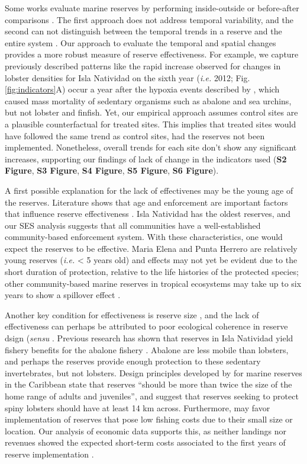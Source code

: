 \documentclass{frontiersSCNS}
\theoremstyle{definition}
\theoremstyle{definition}
\theoremstyle{definition}
\theoremstyle{remark}
\begin{document}
Some works evaluate marine reserves by performing inside-outside
\citep{guidetti_2014-8Z,friedlander_2017-oI,rodriguez_2017-PD} or
before-after comparisons \citep{betti_2017-lq}. The first approach does
not address temporal variability, and the second can not distinguish
between the temporal trends in a reserve and the entire system
\citep{depalma_2018}. Our approach to evaluate the temporal and spatial
changes provides a more robust measure of reserve effectiveness. For
example, we capture previously described patterns like the rapid
increase observed for changes in lobster densities for Isla Natividad on
the sixth year (\emph{i.e.} 2012; Fig. \ref{fig:indicators}A) occur a
year after the hypoxia events described by \citet{micheli_2012-EU},
which caused mass mortality of sedentary organisms such as abalone and
sea urchins, but not lobster and finfish. Yet, our empirical approach
assumes control sites are a plausible counterfactual for treated sites.
This implies that treated sites would have followed the same trend as
control sites, had the reserves not been implemented. Nonetheless,
overall trends for each site don't show any significant increases,
supporting our findings of lack of change in the indicators used
(\textbf{S2 Figure}, \textbf{S3 Figure}, \textbf{S4 Figure}, \textbf{S5
Figure}, \textbf{S6 Figure}).

A first possible explanation for the lack of effectivenes may be the
young age of the reserves. Literature shows that age and enforcement are
important factors that influence reserve effectiveness
\citep{edgar_2014-UO,babcock_2010}. Isla Natividad has the oldest
reserves, and our SES analysis suggests that all communities have a
well-established community-based enforcement system. With these
characteristics, one would expect the reserves to be effective. Maria
Elena and Punta Herrero are relatively young reserves (\emph{i.e.}
\textless{} 5 years old) and effects may not yet be evident due to the
short duration of protection, relative to the life histories of the
protected species; other community-based marine reserves in tropical
ecosystems may take up to six years to show a spillover effect
\citep{dasilva_2015-zX}.

Another key condition for effectiveness is reserve size
\citep{edgar_2014-UO}, and the lack of effectiveness can perhaps be
attributed to poor ecological coherence in reserve dsign (\emph{sensu}
\citet{rees_2018}. Previous research has shown that reserves in Isla
Natividad yield fishery benefits for the abalone fishery
\citep{rossetto_2015-V0}. Abalone are less mobile than lobsters, and
perhaps the reserves provide enough protection to these sedentary
invertebrates, but not lobsters. Design principles developed by
\citet{green_2017} for marine reserves in the Caribbean state that
reserves ``should be more than twice the size of the home range of
adults and juveniles'', and suggest that reserves seeking to protect
spiny lobsters should have at least 14 km across. Furthermore, may favor
implementation of reserves that pose low fishing costs due to their
small size or location. Our analysis of economic data supports this, as
neither landings nor revenues showed the expected short-term costs
associated to the first years of reserve implementation
\citep{ovando_2016-Wg}.
\end{document}
